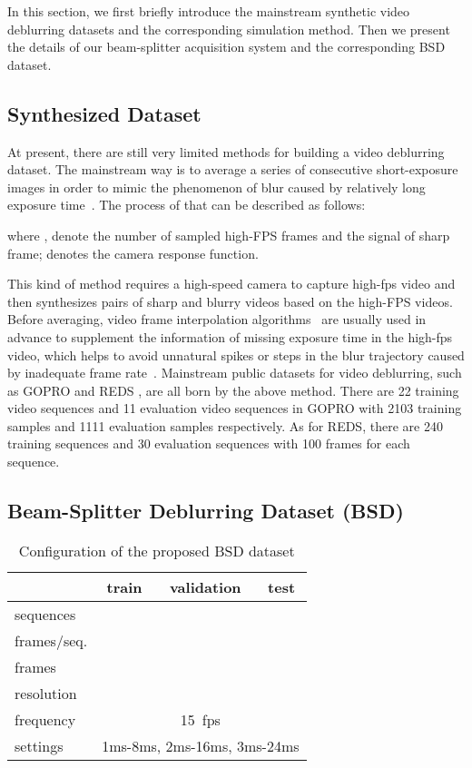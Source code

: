 \documentclass[twocolumn]{svjour3}          \smartqed  \usepackage{graphicx}
\begin{document}
In this section, we first briefly introduce the mainstream synthetic video deblurring datasets and the corresponding simulation method. Then we present the details of our beam-splitter acquisition system and the corresponding BSD dataset.

\subsection{Synthesized Dataset}

At present, there are still very limited methods for building a video deblurring dataset. The mainstream way is to average a series of consecutive short-exposure images in order to mimic the phenomenon of blur caused by relatively long exposure time~\cite{kim2016dynamic}. The process of that can be described as follows:

where ,  denote the number of sampled high-FPS frames and the signal of  sharp frame;  denotes the camera response function.

This kind of method requires a high-speed camera to capture high-fps video and then synthesizes pairs of sharp and blurry videos based on the high-FPS videos. Before averaging, video frame interpolation algorithms~\cite{niklaus2017video} are usually used in advance to supplement the information of missing exposure time in the high-fps video, which helps to avoid unnatural spikes or steps in the blur trajectory caused by inadequate frame rate~\cite{wieschollek2017learning}. Mainstream public datasets for video deblurring, such as GOPRO \cite{nah2017deep} and REDS \cite{nah2019ntire}, are all born by the above method. There are 22 training video sequences and 11 evaluation video sequences in GOPRO with 2103 training samples and 1111 evaluation samples respectively. As for REDS, there are 240 training sequences and 30 evaluation sequences with 100 frames for each sequence.

\subsection{Beam-Splitter Deblurring Dataset (BSD)}

\begin{table}[b]
	\caption{Configuration of the proposed BSD dataset}
	\label{table:bsd_config}
	\begin{center}
		\begin{tabular}{lccc}
			\toprule
			&  train & validation & test\\
\midrule
			sequences&  &  & \\
frames/seq.&   &  & \\
frames&   &  & \\
resolution& \multicolumn{3}{c}{}\\
frequency& \multicolumn{3}{c}{\SI{15}{fps}}\\
settings& \multicolumn{3}{c}{1ms-8ms, 2ms-16ms, 3ms-24ms}\\
			\bottomrule
		\end{tabular}
	\end{center}
\end{table}
\end{document}
